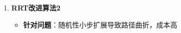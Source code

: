 \documentclass[../main.tex]{subfiles}
\begin{document}
\begin{enumerate}
\begin{enumerate}
                \begin{itemize}
                    \item \textbf{针对问题}：RRT扩张偏向状态空间未探测部分，但不是偏向目标点，当环境复杂时计算效率低
                    \item \textbf{解决办法}：双向搜索Bidirectional-RRT\footnote{使用两棵树（或搜索图）来实现路径规划，分别从起点和终点出发。每次生成两个随机点进行路径生长。一旦两棵树在某处相交，就可以找到一条从起点到终点的路径，因此搜索一定程度上会更加高效。}
                \end{itemize}
            \item \textbf{RRT改进算法2}\label{item:prob:rrt:improv2}
                \begin{itemize}
                    \item \textbf{针对问题}：随机性小步扩展导致路径曲折，成本高


\end{itemize}
\end{enumerate}
\end{enumerate}
\end{document}
